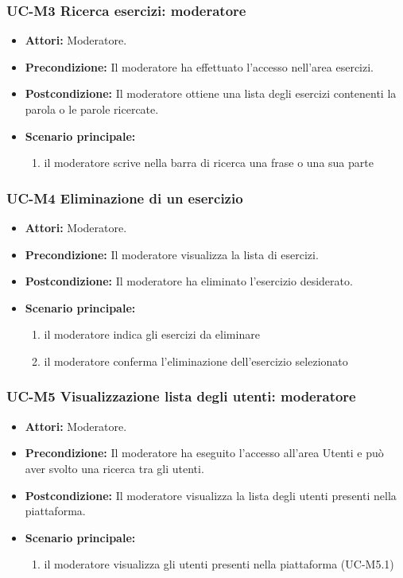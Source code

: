 \subsubsection{UC-M3 Ricerca esercizi: moderatore}
	\begin{itemize}
		\item \textbf{Attori:} Moderatore.
		\item \textbf{Precondizione:} Il moderatore ha effettuato l'accesso nell'area esercizi.
		\item \textbf{Postcondizione:} Il moderatore ottiene una lista degli esercizi contenenti la parola o le parole ricercate.
		\item \textbf{Scenario principale:}
			\begin{enumerate}
				\item il moderatore scrive nella barra di ricerca una frase o una sua parte
			\end{enumerate}
	\end{itemize}
	
\subsubsection{UC-M4 Eliminazione di un esercizio}
			\begin{itemize}
			\item \textbf{Attori:} Moderatore.
			\item \textbf{Precondizione:} Il moderatore visualizza la lista di esercizi.
			\item \textbf{Postcondizione:} Il moderatore ha eliminato l'esercizio desiderato.
			\item \textbf{Scenario principale:}
				\begin{enumerate}
					\item il moderatore indica gli esercizi da eliminare
					\item il moderatore conferma l'eliminazione dell'esercizio selezionato
				\end{enumerate}
		\end{itemize}

\subsubsection{UC-M5 Visualizzazione lista degli utenti: moderatore}
	\begin{itemize}
		\item \textbf{Attori:} Moderatore.
		\item \textbf{Precondizione:} Il moderatore ha eseguito l'accesso all'area Utenti e può aver svolto una ricerca tra gli utenti.
		\item \textbf{Postcondizione:} Il moderatore visualizza la lista degli utenti presenti nella piattaforma.
		\item \textbf{Scenario principale:}
			\begin{enumerate}
				\item il moderatore visualizza gli utenti presenti nella piattaforma (UC-M5.1)
			\end{enumerate}
	\end{itemize}
	

